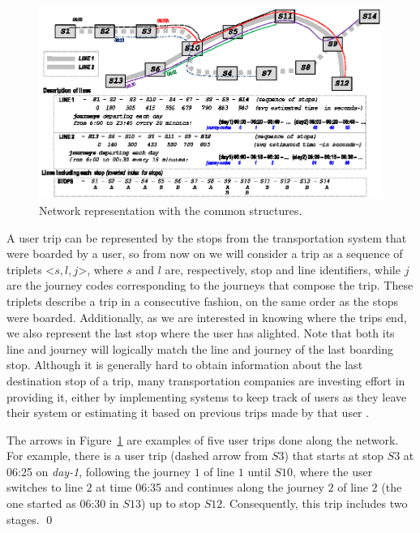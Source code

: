     \begin{figure}[ht]
        \includegraphics[width=\textwidth]{figures/network.eps}
        \caption{Network representation with the common structures.}
        \label{fig:example_trips_ttctr}
    \end{figure}
    
    A user trip can be represented by the stops from the transportation system that were boarded by a user, so from now on we will consider a trip as a sequence of triplets <$s,l,j$>, where $s$ and $l$ are, respectively, stop and line identifiers, while $j$ are the journey codes corresponding to the journeys that compose the trip. These triplets describe a trip in a consecutive fashion, on the same order as the stops were boarded. Additionally, as we are interested in knowing where the trips end, we also represent the last stop where the user has alighted. Note that both its line and journey will logically match the line and journey of the last boarding stop. Although it is generally hard to obtain information about the last destination stop of a trip, many transportation companies are investing effort in providing it, either by implementing systems to keep track of users as they leave their system or estimating it based on previous trips made by that user \cite{alsger2016validating}.
    
    \medskip
    \begin{example}
    The arrows in Figure~\ref{fig:example_trips_ttctr} are examples of five user trips done along the network.
    For example, there is a user trip (dashed arrow from $S3$) that starts at stop $S3$ at 06:25 on {\em day-1}, 
    following the journey $1$ of line $1$ until $S10$, where the user switches to line $2$ at time 06:35 
    and continues along the journey $2$ of line $2$ (the one started as 06:30 in $S13$) up to stop $S12$. Consequently, this trip includes two stages.
    \qed
    \end{example}
    
